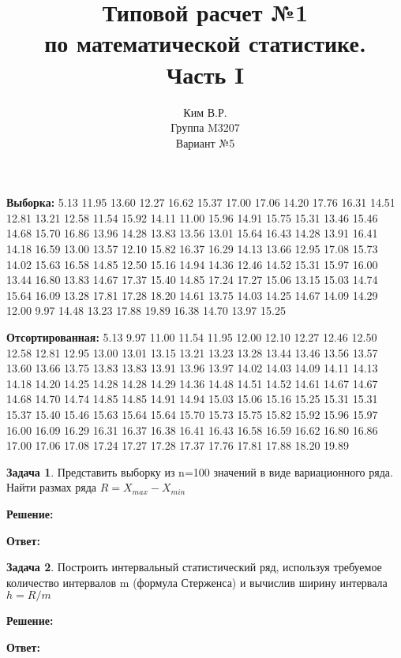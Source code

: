 \documentclass[a4paper,12pt]{article}
\title{Типовой расчет №1 \\ по математической статистике. \\ Часть I}
\author{Ким В.Р. \\ Группа M3207 \\ Вариант №5}
\date{}
\theoremstyle{definition}
\newtheorem{problem}{Задача}
\newenvironment{solution}
{\begin{shaded}\textbf{Решение:}\par}
{\end{shaded}}
\newenvironment{answer}
{\par\noindent\textbf{Ответ:} \color{blue}}
{\par}
\begin{document}
\maketitle

\par\noindent\textbf{Выборка:}
5.13 11.95 13.60 12.27 16.62 15.37 17.00 17.06 14.20 17.76 16.31 14.51 12.81 13.21 12.58
11.54 15.92 14.11 11.00 15.96 14.91 15.75 15.31 13.46 15.46 14.68 15.70 16.86 13.96 14.28
13.83 13.56 13.01 15.64 16.43 14.28 13.91 16.41 14.18 16.59 13.00 13.57 12.10 15.82 16.37
16.29 14.13 13.66 12.95 17.08 15.73 14.02 15.63 16.58 14.85 12.50 15.16 14.94 14.36 12.46
14.52 15.31 15.97 16.00 13.44 16.80 13.83 14.67 17.37 15.40 14.85 17.24 17.27 15.06 13.15
15.03 14.74 15.64 16.09 13.28 17.81 17.28 18.20 14.61 13.75 14.03 14.25 14.67 14.09 14.29
12.00 9.97 14.48 13.23 17.88 19.89 16.38 14.70 13.97 15.25
\\
\par\noindent\textbf{Отсортированная:}
5.13 9.97 11.00 11.54 11.95 12.00 12.10 12.27 12.46 12.50 12.58 12.81 12.95 13.00 13.01
13.15 13.21 13.23 13.28 13.44 13.46 13.56 13.57 13.60 13.66 13.75 13.83 13.83 13.91 13.96
13.97 14.02 14.03 14.09 14.11 14.13 14.18 14.20 14.25 14.28 14.28 14.29 14.36 14.48 14.51
14.52 14.61 14.67 14.67 14.68 14.70 14.74 14.85 14.85 14.91 14.94 15.03 15.06 15.16 15.25
15.31 15.31 15.37 15.40 15.46 15.63 15.64 15.64 15.70 15.73 15.75 15.82 15.92 15.96 15.97
16.00 16.09 16.29 16.31 16.37 16.38 16.41 16.43 16.58 16.59 16.62 16.80 16.86 17.00 17.06
17.08 17.24 17.27 17.28 17.37 17.76 17.81 17.88 18.20 19.89

\vspace{8pt}
\begin{problem}
    Представить выборку из n=100 значений в виде вариационного ряда. Найти
    размах ряда $R = X_{max} - X_{min}$
        \begin{solution}
        \end{solution}

        \begin{answer}
        \end{answer}

    \end{problem}



\vspace{8pt}
\begin{problem}
    Построить интервальный статистический ряд, используя требуемое количество
    интервалов m (формула Стерженса) и вычислив ширину интервала \(h = R/m\)
    
        \begin{solution}
        \end{solution}
    
        \begin{answer}
        \end{answer}
    
    \end{problem}
\end{document}
